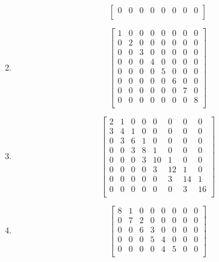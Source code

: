 \documentclass{article}
\theoremstyle{remark}
\begin{document}
\begin{enumerate}
\begin{displaymath}
\begin{bmatrix}
      0 & 0 & 0 & 0 & 0 & 0 & 0 & 0 \\
    \end{bmatrix}
  \end{displaymath}
\item
  \begin{displaymath}
    \begin{bmatrix}
      1 & 0 & 0 & 0 & 0 & 0 & 0 & 0 \\
      0 & 2 & 0 & 0 & 0 & 0 & 0 & 0 \\
      0 & 0 & 3 & 0 & 0 & 0 & 0 & 0 \\
      0 & 0 & 0 & 4 & 0 & 0 & 0 & 0 \\
      0 & 0 & 0 & 0 & 5 & 0 & 0 & 0 \\
      0 & 0 & 0 & 0 & 0 & 6 & 0 & 0 \\
      0 & 0 & 0 & 0 & 0 & 0 & 7 & 0 \\
      0 & 0 & 0 & 0 & 0 & 0 & 0 & 8 \\
    \end{bmatrix}
  \end{displaymath}
\item
  \begin{displaymath}
    \begin{bmatrix}
      2 & 1 & 0 & 0 & 0 & 0 & 0 & 0 \\
      3 & 4 & 1 & 0 & 0 & 0 & 0 & 0 \\
      0 & 3 & 6 & 1 & 0 & 0 & 0 & 0 \\
      0 & 0 & 3 & 8 & 1 & 0 & 0 & 0 \\
      0 & 0 & 0 & 3 & 10 & 1 & 0 & 0 \\
      0 & 0 & 0 & 0 & 3 & 12 & 1 & 0 \\
      0 & 0 & 0 & 0 & 0 & 3 & 14 & 1 \\
      0 & 0 & 0 & 0 & 0 & 0 & 3 & 16 \\
    \end{bmatrix}
  \end{displaymath}
\item
  \begin{displaymath}
    \begin{bmatrix}
      8 & 1 & 0 & 0 & 0 & 0 & 0 & 0 \\
      0 & 7 & 2 & 0 & 0 & 0 & 0 & 0 \\
      0 & 0 & 6 & 3 & 0 & 0 & 0 & 0 \\
      0 & 0 & 0 & 5 & 4 & 0 & 0 & 0 \\
      0 & 0 & 0 & 0 & 4 & 5 & 0 & 0 \\

\end{bmatrix}
\end{displaymath}
\end{enumerate}
\end{document}
